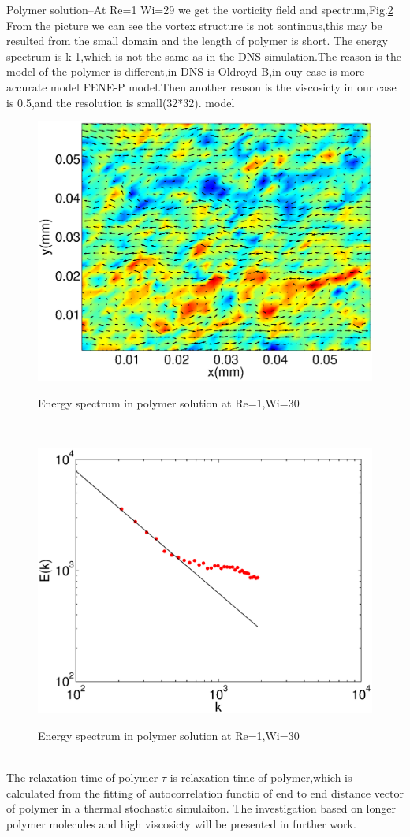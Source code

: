 \documentclass[aps,prl,twocolumn,showpacs,superscriptaddress,groupedaddress]{revtex4}  %
\begin{document}
Polymer solution--At Re=1 Wi=29 we get the vorticity field and spectrum,Fig.\ref{fig:spepols}
From the picture we can see the vortex structure is not sontinous,this may be resulted from the small domain and the length of polymer is short.
The energy spectrum is k-1,which is not the same as in the DNS simulation.The reason is the model of the polymer is different,in DNS is Oldroyd-B,in ouy case is more accurate model
FENE-P model.Then another reason is the viscosicty in our case is 0.5,and the resolution is small(32*32).
model
\begin{figure}
 \includegraphics[scale=0.5]{vorpols}
\label{fig:vorpols}
\caption{Energy spectrum in polymer solution at Re=1,Wi=30}
\end{figure}\\
\begin{figure}
 \includegraphics[scale=0.5]{spepols}
\label{fig:spepols}
\caption{Energy spectrum in polymer solution at Re=1,Wi=30}
\end{figure}\\
The relaxation time of polymer 
 $\tau$ is relaxation time of polymer,which is 
calculated from the fitting of autocorrelation functio of end to end distance vector of polymer in a thermal stochastic simulaiton.
The investigation based on longer polymer molecules and high viscosicty will be presented in further work.


\end{document}
